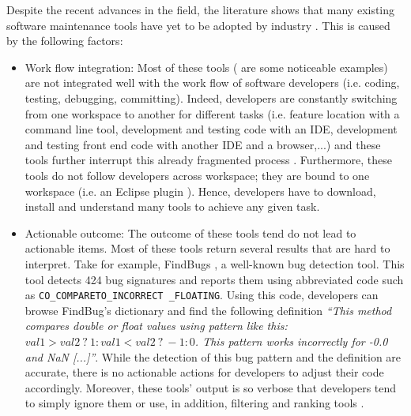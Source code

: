 Despite the recent advances in the field,  the literature shows that many existing software maintenance tools have yet to be adopted by industry \cite{Lewis2013,Foss2015,Layman2007,Ayewah2007,Ayewah2008,Johnson2013,Norman2013, Hovemeyer2004, Lopez2011}. This is caused by the following factors:
\begin{itemize}
	\item Work flow integration: Most of these tools (\cite{Rutar,Hovemeyer2004a,Kim2006a,Ayewah2008b, Findbugs2015,Moha2010,Palma,Nayrolles2013d,Nayrolles,Nayrolles2013a, Nayrolles2015a} are some noticeable examples) are not integrated well with the work flow of software developers (i.e. coding, testing, debugging, committing).
	Indeed, developers are constantly switching from one workspace to another for different tasks (i.e. feature location with a command line tool, development and testing  code with an IDE, development and testing front end code with another IDE and a browser,...) \cite{Gonzalez2004,Ko2006a,Layman2009a,Murphy-Hill2012a} and these tools further interrupt this already fragmented process 	\cite{Robertson2004,Robertson2006,Beckwith2006}.
	Furthermore, these tools do not follow developers across workspace; they are bound to one workspace (i.e. an Eclipse plugin \cite{Verbaere2007}).
	Hence, developers have to download, install and understand many tools to achieve any given task.

	\item Actionable outcome: The outcome of these tools tend do not lead to actionable items.
	Most of these tools return several results that are hard to interpret.
	Take for example, FindBugs \cite{Hovemeyer2004}, a well-known bug detection tool.
	This tool detects 424 bug signatures and reports them using abbreviated code such as {\tt CO\_COMPARETO\_INCORRECT \_FLOATING}.
	Using this code, developers can browse FindBug's dictionary and find the following definition {\it ``This method compares double or float values using pattern like this: $val1 > val2~?~1 : val1 < val2~?~-1 : 0$. This pattern works incorrectly for -0.0 and NaN [...]''}\cite{Findbugs2015}.
	While the detection of this bug pattern and the definition are accurate, there is no actionable actions for developers to adjust their code accordingly.
	Moreover, these tools' output is so verbose that developers tend to simply ignore them \cite{Arai2014, Kim2007b, Kim2007c} or use, in addition, filtering and ranking tools \cite{Ayewah2010, Shen2011}.


\end{itemize}

